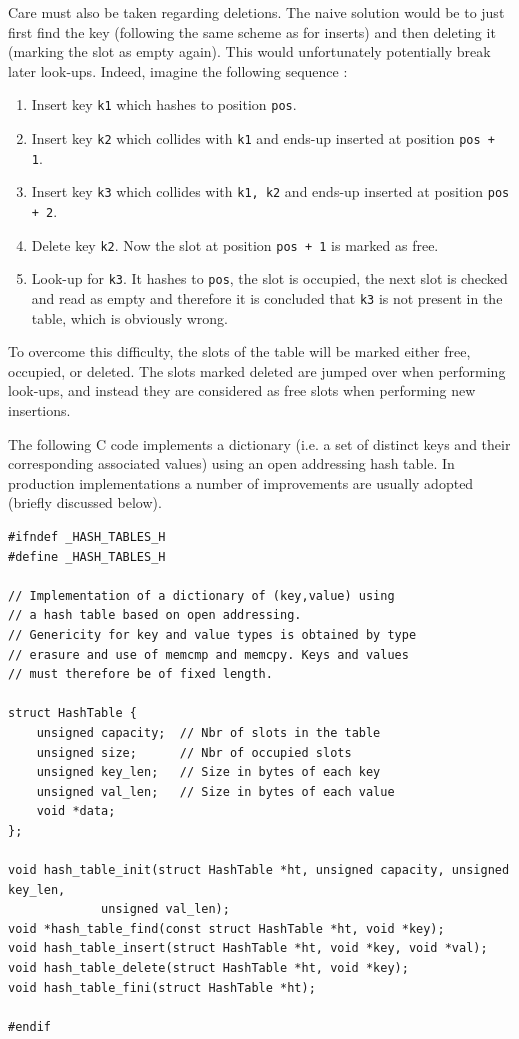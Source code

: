 \documentclass[12pt]{article}
\theoremstyle{plain}
\theoremstyle{remark}
\begin{document}
Care must also be taken regarding deletions. The naive solution would be to just
first find the key (following the same scheme as for inserts) and then deleting
it (marking the slot as empty again). This would unfortunately potentially break
later look-ups. Indeed, imagine the following sequence :
\begin{enumerate}
	\item Insert key {\tt k1} which hashes to position {\tt pos}.
	\item Insert key {\tt k2} which collides with {\tt k1} and ends-up
		inserted at position {\tt pos + 1}.
	\item Insert key {\tt k3} which collides with {\tt k1, k2} and ends-up
		inserted at position {\tt pos + 2}.
	\item Delete key {\tt k2}. Now the slot at position {\tt pos + 1} is
		marked as free.
	\item Look-up for {\tt k3}. It hashes to {\tt pos}, the slot is
		occupied, the next slot is checked and read as empty and
		therefore it is concluded that {\tt k3} is not present in the
		table, which is obviously wrong.
\end{enumerate}

To overcome this difficulty, the slots of the table will be marked either free,
occupied, or deleted. The slots marked deleted are jumped over when performing
look-ups, and instead they are considered as free slots when performing new
insertions.

\medskip

The following C code implements a dictionary (i.e. a set of distinct keys and
their corresponding associated values) using an open addressing hash table. In 
production implementations a number of improvements are usually adopted (briefly 
discussed below).

\begin{lstlisting}[style=C]
#ifndef _HASH_TABLES_H
#define _HASH_TABLES_H

// Implementation of a dictionary of (key,value) using
// a hash table based on open addressing.
// Genericity for key and value types is obtained by type
// erasure and use of memcmp and memcpy. Keys and values
// must therefore be of fixed length.

struct HashTable {
	unsigned capacity;  // Nbr of slots in the table
	unsigned size;	    // Nbr of occupied slots
	unsigned key_len;   // Size in bytes of each key
	unsigned val_len;   // Size in bytes of each value
	void *data;
};

void hash_table_init(struct HashTable *ht, unsigned capacity, unsigned key_len,
		     unsigned val_len);
void *hash_table_find(const struct HashTable *ht, void *key);
void hash_table_insert(struct HashTable *ht, void *key, void *val);
void hash_table_delete(struct HashTable *ht, void *key);
void hash_table_fini(struct HashTable *ht);

#endif
\end{lstlisting}
\end{document}
